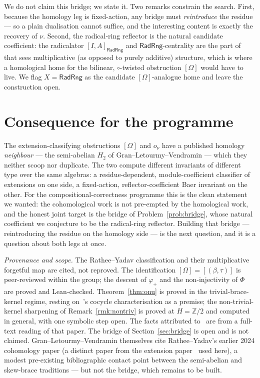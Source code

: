 \documentclass[11pt]{article}
\theoremstyle{definition}
\newcommand{\RadRng}{\mathsf{RadRng}}
\newcommand{\Z}{\mathbb{Z}}
\begin{document}
We do not claim this bridge; we state it. Two remarks constrain the search. First, because the
homology leg is fixed-action, any bridge must \emph{reintroduce} the residue --- so a plain
dualisation cannot suffice, and the interesting content is exactly the recovery of $\nu$.
Second, the radical-ring reflector is the natural candidate coefficient: the radicalator
$[I,A]_{\RadRng}$ and $\RadRng$-centrality are the part of~\cite{GLV} that sees multiplicative
(as opposed to purely additive) structure, which is where a homological home for the
bilinear, $\circ$-twisted obstruction $[\Omega]$ would have to live. We flag
$X=\RadRng$ as the candidate $[\Omega]$-analogue home and leave the construction open.

\section{Consequence for the programme}\label{sec:conclusion}

The extension-classifying obstructions $[\Omega]$ and $o_\nu$ have a published homology
\emph{neighbour} --- the semi-abelian $H_2$ of Gran--Letourmy--Vendramin --- which they
neither scoop nor duplicate. The two compute different invariants of different type over the
same algebras: a residue-dependent, module-coefficient classifier of extensions on one side,
a fixed-action, reflector-coefficient Baer invariant on the other. For the
compositional-correctness programme this is the clean statement we wanted: the cohomological
work is not pre-empted by the homological work, and the honest joint target is the bridge of
Problem~\ref{prob:bridge}, whose natural coefficient we conjecture to be the radical-ring
reflector. Building that bridge --- reintroducing the residue on the homology side --- is the
next question, and it is a question about both legs at once.

\medskip
\noindent\emph{Provenance and scope.} The Rathee--Yadav classification and their
multiplicative forgetful map are cited, not reproved. The identification $[\Omega]=[(\beta,\tau)]$
is peer-reviewed within the group; the descent of $\varphi_+$ and the non-injectivity of
$\Phi$ are proved and Lean-checked. Theorem~\ref{thm:onu} is proved in the trivial-brace-kernel
regime, resting on~\cite{RY}'s cocycle characterisation as a premise; the non-trivial-kernel
sharpening of Remark~\ref{rmk:nontriv} is proved at $H=\Z/2$ and computed in general, with one
symbolic step open. The facts attributed to~\cite{GLV} are from a full-text reading of that
paper. The bridge of Section~\ref{sec:bridge} is open and is not claimed. Gran--Letourmy--Vendramin
themselves cite Rathee--Yadav's earlier 2024 cohomology paper (a distinct paper from the
extension paper~\cite{RY} used here), a modest pre-existing bibliographic contact point between
the semi-abelian and skew-brace traditions --- but not the bridge, which remains to be built.
\end{document}
